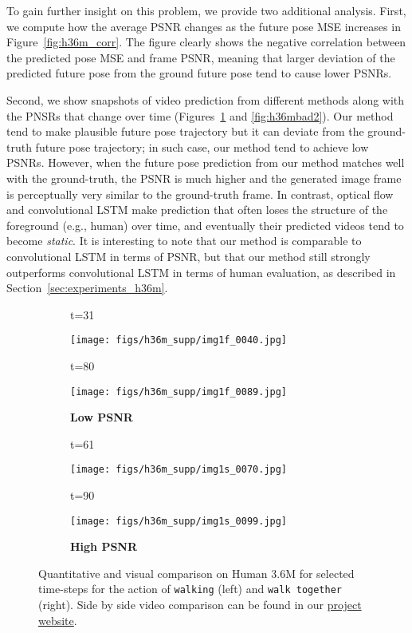\documentclass{article}
\begin{document}
\begin{appendix}
To gain further insight on this problem,  we provide two additional analysis. 
First, we compute how the average PSNR changes as the future pose MSE increases in Figure~\ref{fig:h36m_corr}.
The figure clearly shows the negative correlation between the predicted pose MSE and frame PSNR, meaning that larger deviation of the predicted future pose from the ground future pose tend to cause lower PSNRs.

Second, we show snapshots of video prediction from different methods along with the PNSRs that change over time (Figures~\ref{fig:h36mbad1} and \ref{fig:h36mbad2}).
Our method tend to make plausible future pose trajectory but it can deviate from the ground-truth future pose trajectory; in such case, our method tend to achieve low PSNRs. 
However, when the future pose prediction from our method matches well with the ground-truth, the PSNR is much higher and the generated image frame is perceptually very similar to the ground-truth frame.
In contrast, optical flow and convolutional LSTM make prediction that often loses the structure of the foreground (e.g., human) over time, and eventually their predicted videos tend to become \emph{static}.
It is interesting to note that our method is comparable to convolutional LSTM in terms of PSNR, but that our method still strongly outperforms convolutional LSTM in terms of human evaluation, as described in Section~\ref{sec:experiments_h36m}. %

\begin{figure}[htb!]
    \centering
    \begin{subfigure}{0.40\linewidth}
        \caption*{t=31}
        \vspace{-9pt}
	    \texttt{[image: figs/h36m\_supp/img1f\_0040.jpg]}
  		\caption*{t=80}
        \vspace{-9pt}
  		\texttt{[image: figs/h36m\_supp/img1f\_0089.jpg]}
  		\caption*{\textbf{Low PSNR}}
	\end{subfigure}
	\hspace{10pt}
    \begin{subfigure}{0.40\linewidth}
        \caption*{t=61}
        \vspace{-9pt}
	    \texttt{[image: figs/h36m\_supp/img1s\_0070.jpg]}
  		\caption*{t=90}
        \vspace{-9pt}
  		\texttt{[image: figs/h36m\_supp/img1s\_0099.jpg]}
  		\caption*{\textbf{High PSNR}}
	\end{subfigure}
	\vspace{-.3cm}
    \caption{Quantitative and visual comparison on Human 3.6M for selected time-steps for the action of \texttt{walking} (left) and \texttt{walk together} (right). Side by side video comparison can be found in our \href{https://goo.gl/U7UOfy}{project website}.}
\label{fig:h36mbad1}
\vspace{-40pt}
\end{figure}


\end{appendix}
\end{document}
